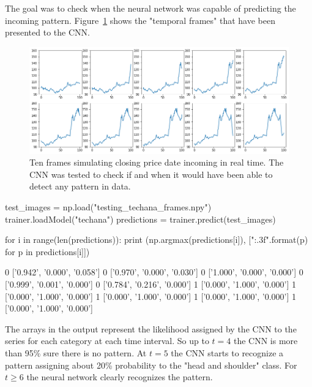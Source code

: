 The goal was to check when the neural network was
capable of predicting the incoming pattern. Figure~\ref{fig:frame_simulation}
shows the "temporal frames" that have been presented to the CNN.

\begin{figure}
	\centering
	\includegraphics[width=\textwidth]{figures/tech_ana_frames.png}
	\caption{Ten frames simulating closing price date incoming in real time. The CNN was tested to check if and when it would have been able to detect any pattern in data.}
	\label{fig:frame_simulation}
\end{figure}


\begin{ipython}
test_images = np.load("testing_techana_frames.npy")
trainer.loadModel("techana")
predictions = trainer.predict(test_images)

for i in range(len(predictions)):
    print (np.argmax(predictions[i]), ["{:.3f}".format(p) for p in predictions[i]])
\end{ipython}
\begin{ioutput}
0 ['0.942', '0.000', '0.058']
0 ['0.970', '0.000', '0.030']
0 ['1.000', '0.000', '0.000']
0 ['0.999', '0.001', '0.000']
0 ['0.784', '0.216', '0.000']
1 ['0.000', '1.000', '0.000']
1 ['0.000', '1.000', '0.000']
1 ['0.000', '1.000', '0.000']
1 ['0.000', '1.000', '0.000']
1 ['0.000', '1.000', '0.000']
\end{ioutput}
\noindent
The arrays in the output represent the likelihood assigned by the CNN to the series for each category
at each time interval. So up to $t=4$ the CNN is more than 95\% sure there is no pattern. 
At $t=5$ the CNN starts to recognize a pattern assigning about 20\% probability to the "head and shoulder" class.
For $t\geq 6$ the neural network clearly recognizes the pattern.

